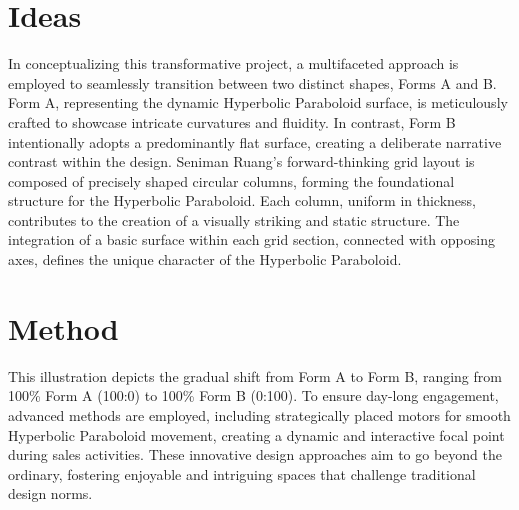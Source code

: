 \begin{minipage}[t][(\PaperHeight-\PaperTopMargin-\PaperBottomMargin
		-16pt%
		)\relax][t]{\linewidth}%
	\ChapterFrontmatter
	\section*{
	  Ideas
	 }
	\begin{multicols}{2}
		
		
	\end{multicols}
	In conceptualizing this transformative project, a multifaceted approach is employed to seamlessly transition between two distinct shapes, Forms A and B. Form A, representing the dynamic Hyperbolic Paraboloid surface, is meticulously crafted to showcase intricate curvatures and fluidity. In contrast, Form B intentionally adopts a predominantly flat surface, creating a deliberate narrative contrast within the design.
	\vspace{\baselineskip}
	\newline%
	Seniman Ruang's forward-thinking grid layout is composed of precisely shaped circular columns, forming the foundational structure for the Hyperbolic Paraboloid. Each column, uniform in thickness, contributes to the creation of a visually striking and static structure. The integration of a basic surface within each grid section, connected with opposing axes, defines the unique character of the Hyperbolic Paraboloid.
	\section*{
	  Method
	 }
	\begin{minipage}[t]{0.65\linewidth}
		
	\end{minipage}
	\hfill
	\begin{minipage}[t]{0.3\linewidth}
		
	\end{minipage}
	\vfill
	This illustration depicts the gradual shift from Form A to Form B, ranging from 100\% Form A (100:0) to 100\% Form B (0:100). To ensure day-long engagement, advanced methods are employed, including strategically placed motors for smooth Hyperbolic Paraboloid movement, creating a dynamic and interactive focal point during sales activities. These innovative design approaches aim to go beyond the ordinary, fostering enjoyable and intriguing spaces that challenge traditional design norms.
\end{minipage}
\EndTwoColumnLayout
\newpage
